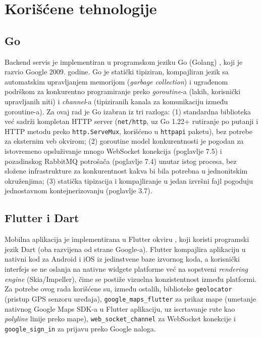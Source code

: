 \chapter{Korišćene tehnologije}

\section{Go}

Backend servis je implementiran u programskom jeziku Go (Golang) \cite{go}, koji je razvio Google 2009. godine. Go je statički tipiziran, kompajliran jezik sa automatskim upravljanjem memorijom (\emph{garbage collection}) i ugrađenom podrškom za konkurentno programiranje preko \emph{goroutine}-a (lakih, korisnički upravljanih niti) i \emph{channel}-a (tipiziranih kanala za komunikaciju između goroutine-a). Za ovaj rad je Go izabran iz tri razloga: (1) standardna biblioteka već sadrži kompletan HTTP server (\texttt{net/http}, uz Go 1.22+ rutiranje po putanji i HTTP metodu preko \texttt{http.ServeMux}, korišćeno u \texttt{httpapi} paketu), bez potrebe za eksternim veb okvirom; (2) goroutine model konkurentnosti je pogodan za istovremeno opsluživanje mnogo WebSocket konekcija (poglavlje 7.5) i pozadinskog RabbitMQ potrošača (poglavlje 7.4) unutar istog procesa, bez složene infrastrukture za konkurentnost kakva bi bila potrebna u jednonitskim okruženjima; (3) statička tipizacija i kompajliranje u jedan izvršni fajl pogoduju jednostavnom kontejnerizovanju (poglavlje 3.7).

\section{Flutter i Dart}

Mobilna aplikacija je implementirana u Flutter okviru \cite{flutter}, koji koristi programski jezik Dart (oba razvijena od strane Google-a). Flutter kompajlira aplikaciju u nativni kod za Android i iOS iz jedinstvene baze izvornog koda, a korisnički interfejs se ne oslanja na nativne widgete platforme već na sopstveni \emph{rendering engine} (Skia/Impeller), čime se postiže vizuelna konzistentnost između platformi. Za potrebe ovog rada korišćene su, između ostalih, biblioteke \texttt{geolocator} (pristup GPS senzoru uređaja), \texttt{google\_maps\_flutter} za prikaz mape (umetanje nativnog Google Maps SDK-a u Flutter aplikaciju, uz iscrtavanje rute kao \emph{polyline} linije preko mape), \texttt{web\_socket\_channel} za WebSocket konekcije i \texttt{google\_sign\_in} za prijavu preko Google naloga.

